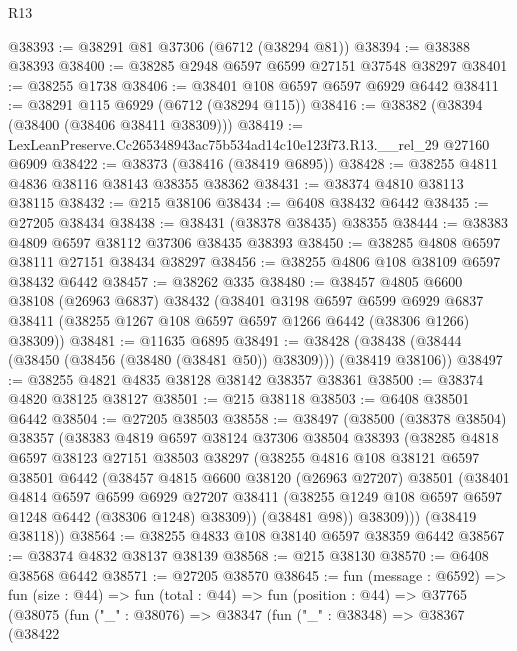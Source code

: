 \begin{lexlean}{R13}
\begin{coremodule}
@38393 := @38291 @81 @37306 (@6712 (@38294 @81))
@38394 := @38388 @38393
@38400 := @38285 @2948 @6597 @6599 @27151 @37548 @38297
@38401 := @38255 @1738
@38406 := @38401 @108 @6597 @6597 @6929 @6442
@38411 := @38291 @115 @6929 (@6712 (@38294 @115))
@38416 := @38382 (@38394 (@38400 (@38406 @38411 @38309)))
@38419 := LexLeanPreserve.Cc265348943ac75b534ad14c10e123f73.R13.__rel_29 @27160 @6909
@38422 := @38373 (@38416 (@38419 @6895))
@38428 := @38255 @4811 @4836 @38116 @38143 @38355 @38362
@38431 := @38374 @4810 @38113 @38115
@38432 := @215 @38106
@38434 := @6408 @38432 @6442
@38435 := @27205 @38434
@38438 := @38431 (@38378 @38435) @38355
@38444 := @38383 @4809 @6597 @38112 @37306 @38435 @38393
@38450 := @38285 @4808 @6597 @38111 @27151 @38434 @38297
@38456 := @38255 @4806 @108 @38109 @6597 @38432 @6442
@38457 := @38262 @335
@38480 := @38457
    @4805
    @6600
    @38108
    (@26963 @6837)
    @38432
    (@38401
      @3198
      @6597
      @6599
      @6929
      @6837
      @38411
      (@38255 @1267 @108 @6597 @6597 @1266 @6442 (@38306 @1266) @38309))
@38481 := @11635 @6895
@38491 := @38428 (@38438 (@38444 (@38450 (@38456 (@38480 (@38481 @50)) @38309))) (@38419 @38106))
@38497 := @38255 @4821 @4835 @38128 @38142 @38357 @38361
@38500 := @38374 @4820 @38125 @38127
@38501 := @215 @38118
@38503 := @6408 @38501 @6442
@38504 := @27205 @38503
@38558 := @38497
    (@38500
      (@38378 @38504)
      @38357
      (@38383
        @4819
        @6597
        @38124
        @37306
        @38504
        @38393
        (@38285
          @4818
          @6597
          @38123
          @27151
          @38503
          @38297
          (@38255
            @4816
            @108
            @38121
            @6597
            @38501
            @6442
            (@38457
              @4815
              @6600
              @38120
              (@26963 @27207)
              @38501
              (@38401
                @4814
                @6597
                @6599
                @6929
                @27207
                @38411
                (@38255 @1249 @108 @6597 @6597 @1248 @6442 (@38306 @1248) @38309))
              (@38481 @98))
            @38309)))
      (@38419 @38118))
@38564 := @38255 @4833 @108 @38140 @6597 @38359 @6442
@38567 := @38374 @4832 @38137 @38139
@38568 := @215 @38130
@38570 := @6408 @38568 @6442
@38571 := @27205 @38570
@38645 := fun (message : @6592) =>
  fun (size : @44) =>
  fun (total : @44) =>
  fun (position : @44) =>
  @37765
    (@38075
      (fun ("_" : @38076) =>
      @38347
        (fun ("_" : @38348) =>
        @38367
          (@38422

\end{coremodule}
\end{lexlean}
